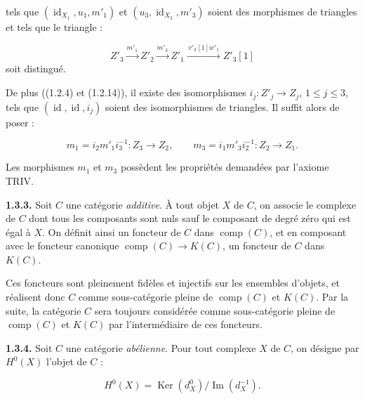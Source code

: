 \clearpage
{}%
\begingroup
\small
\setlength{\emergencystretch}{1.5em}%
\setlength{\abovedisplayskip}{4pt plus 2pt minus 2pt}%
\setlength{\belowdisplayskip}{4pt plus 2pt minus 2pt}%

\noindent tels que
$(\operatorname{id}_{X_1},u_1,m'_1)$ et
$(u_3,\operatorname{id}_{X_3},m'_3)$ soient des morphismes de triangles et
tels que le triangle :

\[
  Z'_3\xrightarrow{m'_1}Z'_2\xrightarrow{m'_3}Z'_1
  \xrightarrow{\,v'_3[1]w'_1\,}Z'_3[1]
\]
\noindent soit distingué.

De plus ((1.2.4) et (1.2.14)), il existe des isomorphismes
$i_j\colon Z'_j\longrightarrow Z_j$, $1\leq j\leq 3$, tels que
$(\operatorname{id},\operatorname{id},i_j)$ soient des isomorphismes de
triangles. Il suffit alors de poser :

\[
  m_1=i_2m'_1i_3^{-1}\colon Z_3\longrightarrow Z_2,
  \qquad
  m_3=i_1m'_3i_2^{-1}\colon Z_2\longrightarrow Z_1.
\]

Les morphismes $m_1$ et $m_3$ possèdent les propriétés demandées par
l'axiome TRIV.

\medskip
\noindent\textbf{1.3.3.}\quad
Soit $C$ une catégorie \emph{additive}. À tout objet $X$ de $C$, on associe
le complexe de $C$ dont tous les composants sont nuls sauf le composant de
degré zéro qui est égal à $X$. On définit ainsi un foncteur de $C$ dans
$\operatorname{comp}(C)$, et en composant avec le foncteur canonique
$\operatorname{comp}(C)\longrightarrow K(C)$, un foncteur de $C$ dans
$K(C)$.

Ces foncteurs sont pleinement fidèles et injectifs sur les ensembles
d'objets, et réalisent donc $C$ comme sous-catégorie pleine de
$\operatorname{comp}(C)$ et $K(C)$. Par la suite, la catégorie $C$ sera
toujours considérée comme sous-catégorie pleine de $\operatorname{comp}(C)$
et $K(C)$ par l'intermédiaire de ces foncteurs.

\medskip
\noindent\textbf{1.3.4.}\quad
Soit $C$ une catégorie \emph{abélienne}. Pour tout complexe $X$ de $C$, on
désigne par $H^0(X)$ l'objet de $C$ :

\[
  H^0(X)=\operatorname{Ker}(d_X^0)/\operatorname{Im}(d_X^{-1}).
  \tag{1.3.4.1}
\]

